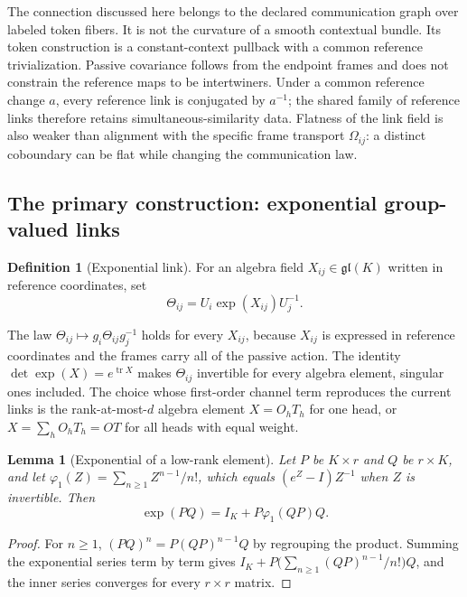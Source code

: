 \documentclass[11pt]{article}
\newtheorem{lemma}[theorem]{Lemma}
\theoremstyle{definition}
\newtheorem{definition}[theorem]{Definition}
\theoremstyle{remark}
\providecommand{\gl}{\mathfrak{gl}}
\providecommand{\tr}{\operatorname{tr}}
\begin{document}
The connection discussed here belongs to the declared communication graph over labeled token fibers. It is not the curvature of a smooth contextual bundle. Its token construction is a constant-context pullback with a common reference trivialization. Passive covariance follows from the endpoint frames and does not constrain the reference maps to be intertwiners. Under a common reference change $a$, every reference link is conjugated by $a^{-1}$; the shared family of reference links therefore retains simultaneous-similarity data. Flatness of the link field is also weaker than alignment with the specific frame transport $\Omega_{ij}$: a distinct coboundary can be flat while changing the communication law.
\subsection{The primary construction: exponential group-valued links}
\label{links:origin:sec:exp}

\begin{definition}[Exponential link]
For an algebra field $X_{ij}\in\gl(K)$ written in reference coordinates, set
\begin{equation}
\Theta_{ij}=U_i\exp(X_{ij})U_j^{-1}.
\label{links:origin:eq:exp_link}
\end{equation}
\end{definition}

The law $\Theta_{ij}\mapsto g_i\Theta_{ij}g_j^{-1}$ holds for every $X_{ij}$, because $X_{ij}$ is expressed in reference coordinates and the frames carry all of the passive action. The identity $\det\exp(X)=e^{\tr X}$ makes $\Theta_{ij}$ invertible for every algebra element, singular ones included. The choice whose first-order channel term reproduces the current links is the rank-at-most-$d$ algebra element $X=O_hT_h$ for one head, or $X=\sum_hO_hT_h=OT$ for all heads with equal weight.

\begin{lemma}[Exponential of a low-rank element]
\label{links:origin:lem:lowrank_exp}
Let $P$ be $K\times r$ and $Q$ be $r\times K$, and let $\varphi_1(Z)=\sum_{n\ge1}Z^{n-1}/n!$, which equals $(e^Z-I)Z^{-1}$ when $Z$ is invertible. Then
\begin{equation}
\exp(PQ)=I_K+P\varphi_1(QP)Q.
\label{links:origin:eq:lowrank_exp}
\end{equation}
\end{lemma}

\begin{proof}
For $n\ge1$, $(PQ)^n=P(QP)^{n-1}Q$ by regrouping the product. Summing the exponential series term by term gives $I_K+P\big(\sum_{n\ge1}(QP)^{n-1}/n!\big)Q$, and the inner series converges for every $r\times r$ matrix.
\end{proof}
\end{document}
